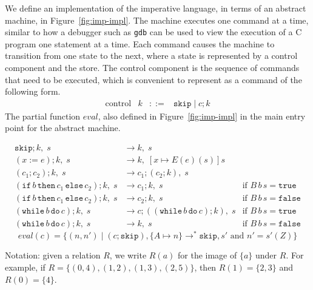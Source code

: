 \documentclass{tufte-handout}
\newcommand{\ASSIGN}[2]{#1 \mathrel{:=} #2}
\newcommand{\SEQ}[2]{#1 \mathrel{;} #2}
\newcommand{\SKIP}[0]{\mathtt{skip}}
\newcommand{\IF}[3]{\mathtt{if}\,#1\,\mathtt{then}\,#2\,\mathtt{else}\,#3}
\newcommand{\WHILE}[2]{\mathtt{while}\,#1\,\mathtt{do}\,#2}
\newcommand{\TRUE}[0]{\mathtt{true}}
\newcommand{\FALSE}[0]{\mathtt{false}}
\begin{document}
We define an implementation of the imperative language, in terms of an
abstract machine, in Figure~\ref{fig:imp-impl}. The machine executes
one command at a time, similar to how a debugger such as \texttt{gdb}
can be used to view the execution of a C program one statement at a
time. Each command causes the machine to transition from one state to
the next, where a state is represented by a control component and the
store. The control component is the sequence of commands that need to
be executed, which is convenient to represent as a command of the
following form.
\[
\begin{array}{lrcl}
  \text{control} & k & ::= & \SKIP \mid \SEQ{c}{k}
\end{array}
\]
The partial function $\mathit{eval}$, also defined in
Figure~\ref{fig:imp-impl} in the main entry point for the abstract
machine.


\begin{figure*}

\hfill {}
\begin{align*}
  \SEQ{\SKIP}{k},\; s & \longrightarrow k,\; s \\
  \SEQ{(\ASSIGN{x}{e})}{k},\; s & \longrightarrow k,\; [x\mapsto E(e)(s)]s\\
  \SEQ{(\SEQ{c_1}{c_2})}{k},\; s & \longrightarrow
      \SEQ{c_1}{(\SEQ{c_2}{k})},\; s \\
  \SEQ{(\IF{b}{c_1}{c_2})}{k},\; s & \longrightarrow \SEQ{c_1}{k},\; s
     & \text{if } B\,b\,s = \TRUE \\
  \SEQ{(\IF{b}{c_1}{c_2})}{k},\; s & \longrightarrow \SEQ{c_2}{k},\; s
     & \text{if } B\,b\,s = \FALSE \\
  \SEQ{(\WHILE{b}{c})}{k},\; s & \longrightarrow
      \SEQ{c}{(\SEQ{(\WHILE{b}{c})}{k})},\; s
    & \text{if } B\,b\,s = \TRUE \\
  \SEQ{(\WHILE{b}{c})}{k},\; s & \longrightarrow k,\; s
    & \text{if } B\,b\,s = \FALSE 
\end{align*}
\[
  \mathit{eval}(c) = \{ (n,n') \mid
     (\SEQ{c}{\SKIP}), \{A\mapsto n\}
     \longrightarrow^{*} \SKIP, s'
     \text{ and } n' = s'(Z) \}
\]
\caption{Abstract Machine for IMP}
\label{fig:imp-impl}
\end{figure*}

Notation: given a relation $R$, we write $R(a)$ for the image of
$\{a\}$ under $R$. For example, if $R=\{ (0,4), (1,2), (1,3), (2,5)
\}$, then $R(1) = \{2,3\}$ and $R(0) = \{4\}$.
\end{document}
